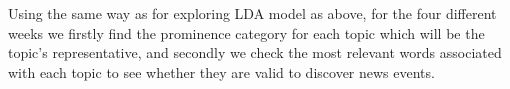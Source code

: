 Using the same way as for exploring LDA model as above, for the four different weeks we firstly find the prominence category for each topic which will be the topic's representative, and secondly we check the most relevant words associated with each topic to see whether they are valid to discover news events.


\begin{figure}[!t]
  \centering
    \vspace*{-.9\baselineskip}

\end{figure}
